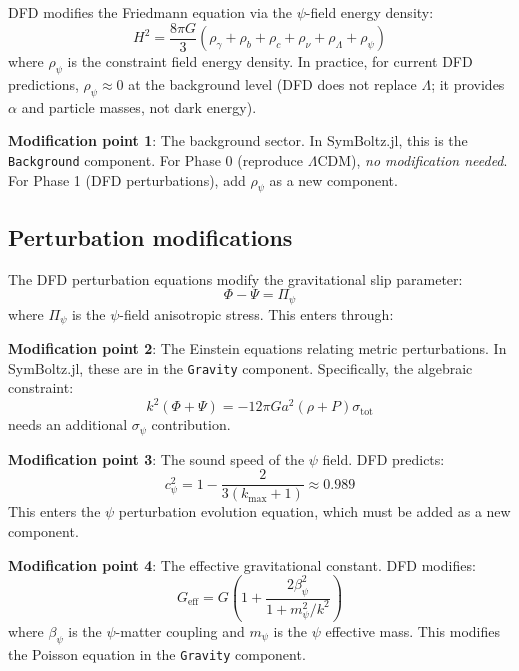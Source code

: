 \documentclass[11pt,a4paper]{article}
\begin{document}
DFD modifies the Friedmann equation via the $\psi$-field energy density:
\begin{equation}
H^2 = \frac{8\pi G}{3}\left(\rho_\gamma + \rho_b + \rho_c + \rho_\nu + \rho_\Lambda + \rho_\psi\right)
\end{equation}
where $\rho_\psi$ is the constraint field energy density. In practice, for current DFD predictions, $\rho_\psi \approx 0$ at the background level (DFD does not replace $\Lambda$; it provides $\alpha$ and particle masses, not dark energy).

\textbf{Modification point 1}: The background sector. In SymBoltz.jl, this is the \texttt{Background} component. For Phase 0 (reproduce $\Lambda$CDM), \emph{no modification needed}. For Phase 1 (DFD perturbations), add $\rho_\psi$ as a new component.

\subsection{Perturbation modifications}

The DFD perturbation equations modify the gravitational slip parameter:
\begin{equation}
\Phi - \Psi = \Pi_\psi
\end{equation}
where $\Pi_\psi$ is the $\psi$-field anisotropic stress. This enters through:

\textbf{Modification point 2}: The Einstein equations relating metric perturbations. In SymBoltz.jl, these are in the \texttt{Gravity} component. Specifically, the algebraic constraint:
\begin{equation}
k^2(\Phi + \Psi) = -12\pi G a^2 (\rho + P)\sigma_{\text{tot}}
\end{equation}
needs an additional $\sigma_\psi$ contribution.

\textbf{Modification point 3}: The sound speed of the $\psi$ field. DFD predicts:
\begin{equation}
c_\psi^2 = 1 - \frac{2}{3(k_{\max}+1)} \approx 0.989
\end{equation}
This enters the $\psi$ perturbation evolution equation, which must be added as a new component.

\textbf{Modification point 4}: The effective gravitational constant. DFD modifies:
\begin{equation}
G_{\text{eff}} = G\left(1 + \frac{2\beta_\psi^2}{1 + m_\psi^2/k^2}\right)
\end{equation}
where $\beta_\psi$ is the $\psi$-matter coupling and $m_\psi$ is the $\psi$ effective mass. This modifies the Poisson equation in the \texttt{Gravity} component.
\end{document}
